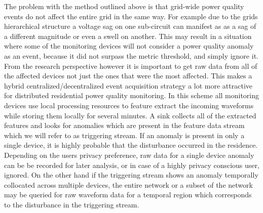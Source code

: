 The problem with the method outlined above is that grid-wide power quality events do not affect the entire grid in the same way. For example due to the grids hierarchical structure a voltage sag on one sub-circuit can manifest as as a sag of a different magnitude or even a swell on another.\cite{kahle2016power} This may result in a situation where some of the monitoring devices will not consider a power quality anomaly as an event, because it did not surpass the metric threshold, and simply ignore it. From the research perspective however it is important to get raw data from all of the affected devices not just the ones that were the most affected. This makes a hybrid centralized/decentralized event acquisition strategy a lot more attractive for distributed residential power quality monitoring. In this scheme all monitoring devices use local processing resources to feature extract the incoming waveforms while storing them locally for several minutes. A sink collects all of the extracted features and looks for anomalies which are present in the feature data stream which we will refer to as triggering stream. If an anomaly is present in only a single device, it is highly probable that the disturbance occurred in the residence. Depending on the users privacy preference, raw data for a single device anomaly can be be recorded for later analysis, or in case of a highly privacy conscious user, ignored. On the other hand if the triggering stream shows an anomaly temporally collocated across multiple devices, the entire network or a subset of the network may be queried for raw waveform data for a temporal region which corresponds to the disturbance in the triggering stream.

